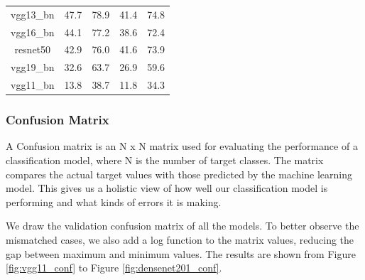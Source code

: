 \begin{table}
\begin{tabular}{ccccc}
    vgg13\_bn               & 47.7     & 78.9     & 41.4       & 74.8       \\
    vgg16\_bn               & 44.1     & 77.2     & 38.6       & 72.4       \\
    resnet50                & 42.9     & 76.0     & 41.6       & 73.9       \\
    vgg19\_bn               & 32.6     & 63.7     & 26.9       & 59.6       \\
    vgg11\_bn               & 13.8     & 38.7     & 11.8       & 34.3       \\
    \bottomrule
  \end{tabular}
\end{table}

\subsubsection{Confusion Matrix}
A Confusion matrix is an N x N matrix used for evaluating the performance of a classification model, where N is the number of target classes. The matrix compares the actual target values with those predicted by the machine learning model. This gives us a holistic view of how well our classification model is performing and what kinds of errors it is making\cite{conf_matrix}.

We draw the validation confusion matrix of all the models. To better observe the mismatched cases, we also add a log function to the matrix values, reducing the gap between maximum and minimum values. The results are shown from Figure \ref{fig:vgg11_conf} to Figure \ref{fig:densenet201_conf}.

